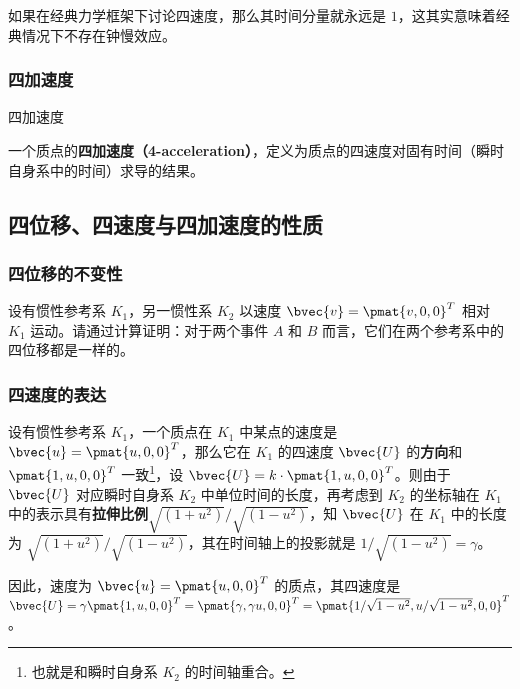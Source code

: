 如果在经典力学框架下讨论四速度，那么其时间分量就永远是 $1$，这其实意味着经典情况下不存在钟慢效应。

\subsubsection{四加速度}

\begin{definition}{四加速度}

一个质点的\textbf{四加速度（4-acceleration）}，定义为质点的四速度对固有时间（瞬时自身系中的时间）求导的结果。

\end{definition}

\subsection{四位移、四速度与四加速度的性质}\label{SR4Rep_sub1}

\subsubsection{四位移的不变性}

\begin{exercise}{}

设有惯性参考系 $K_1$，另一惯性系 $K_2$ 以速度 $\bvec{v}=\pmat{v, 0, 0}^T$ 相对 $K_1$ 运动。请通过计算证明：对于两个事件 $A$ 和 $B$ 而言，它们在两个参考系中的四位移都是一样的。

\end{exercise}

\subsubsection{四速度的表达}

设有惯性参考系 $K_1$，一个质点在 $K_1$ 中某点的速度是 $\bvec{u}=\pmat{u, 0, 0}^T$，那么它在 $K_1$ 的四速度 $\bvec{U}$ 的\textbf{方向}和 $\pmat{1, u, 0, 0}^T$ 一致\footnote{也就是和瞬时自身系 $K_2$ 的时间轴重合。}，设 $\bvec{U}=k\cdot\pmat{1, u, 0, 0}^T$。则由于 $\bvec{U}$ 对应瞬时自身系 $K_2$ 中单位时间的长度，再考虑到 $K_2$ 的坐标轴在 $K_1$ 中的表示具有\textbf{拉伸比例}$\sqrt{(1+u^2)}/\sqrt{(1-u^2)}$，知 $\bvec{U}$ 在 $K_1$ 中的长度为 $\sqrt{(1+u^2)}/\sqrt{(1-u^2)}$，其在时间轴上的投影就是 $1/\sqrt{(1-u^2)}=\gamma$。

因此，速度为 $\bvec{u}=\pmat{u, 0, 0}^T$ 的质点，其四速度是 $\bvec{U}=\gamma\pmat{1, u, 0, 0}^T=\pmat{\gamma, \gamma u, 0, 0}^T=\pmat{1/\sqrt{1-u^2}, u/\sqrt{1-u^2}, 0, 0}^T$。

